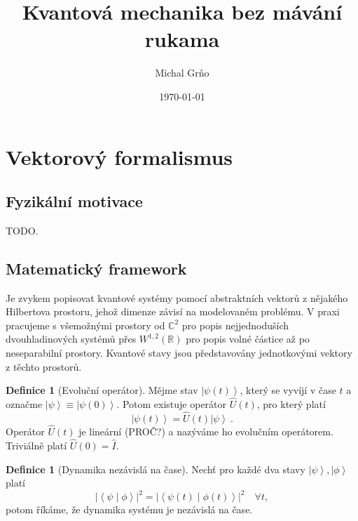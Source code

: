 \documentclass[10pt,a4paper]{article}
\theoremstyle{definition}
\newtheorem{definition}[theorem]{Definice}
\newcommand{\abs}[1]{\left| #1 \right|}
\newcommand{\ket}[1]{\left| #1 \right>}
\newcommand{\braket}[2]{\left< #1 \middle| #2 \right>}
\def\R{\mathbb{R}}
\def\C{\mathbb{C}}
\def\1{\hat{I}}
\begin{document}
\title{Kvantová mechanika bez mávání rukama}
\author{Michal Grňo}
\date{\today}

\maketitle

\section{Vektorový formalismus}

\subsection{Fyzikální motivace}
TODO.

\subsection{Matematický framework}
Je zvykem popisovat kvantové systémy pomocí abstraktních vektorů z nějakého Hilbertova prostoru, jehož dimenze závisí na modelovaném problému. V praxi pracujeme s všemožnými prostory od $\C^2$ pro popis nejjednoduších dvouhladinových systémů přes $W^{1,2}(\R)$ pro popis volné částice až po neseparabilní prostory. Kvantové stavy jsou představovány jednotkovými vektory z těchto prostorů.

\begin{definition}[Evoluční operátor]
    Mějme stav $\ket{\psi(t)}$, který se vyvíjí v čase $t$ a označme $\ket{\psi} \equiv \ket{\psi(0)}$. Potom existuje operátor $\hat{U}(t)$, pro který platí $$\ket{\psi(t)} = \hat{U}(t) \ket{\psi} \: .$$ Operátor $\hat{U}(t)$ je lineární (PROČ?) a nazýváme ho evolučním operátorem. Triviálně platí $\hat{U}(0) = \1$.
\end{definition}

\begin{definition}[Dynamika nezávislá na čase]
    Nechť pro každé dva stavy $\ket{\psi}, \ket{\phi}$ platí $$\abs{\braket{\psi}{\phi}}^2 = \abs{\braket{\psi(t)}{\phi(t)}}^2 \quad \forall t,$$ potom říkáme, že dynamika systému je nezávislá na čase.
\end{definition}
\end{document}
